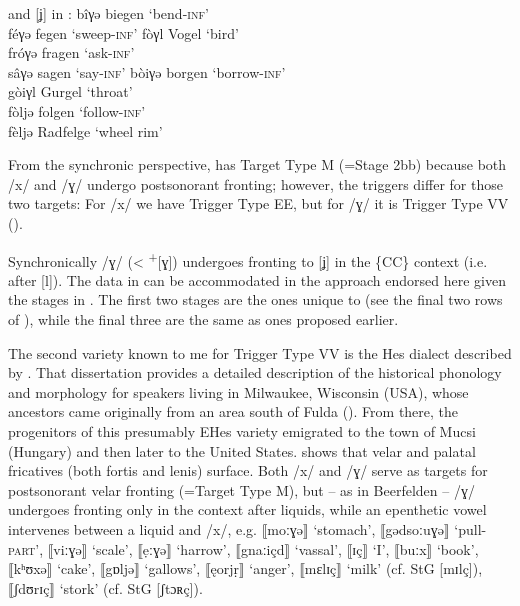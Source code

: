 \ea%
\label{ex:12:21}\relax[ɣ] and [ʝ] in :
\ea\label{ex:12:21a} bîγǝ \tab [bɪːɣǝ] \tab biegen \tab ‘bend\textsc{{}-inf}’ \\
    féγǝ \tab [feːɣǝ] \tab fegen \tab ‘sweep\textsc{{}-inf}’ 
\ex\label{ex:12:21b} fòγl \tab [fɔɣl̩] \tab Vogel \tab ‘bird’ \\
    fróγǝ \tab [froːɣǝ] \tab fragen \tab ‘ask\textsc{{}-inf}’ \\
    sâγǝ \tab [sɑːɣǝ] \tab sagen \tab ‘say\textsc{{}-inf}’ 
\ex\label{ex:12:21c} bòiγǝ \tab [bɔiɣǝ] \tab borgen \tab ‘borrow\textsc{{}-inf}’ \\
    gòiγl \tab [gɔiɣl̩] \tab Gurgel \tab ‘throat’ \\
\ex\label{ex:12:21d} fòljǝ \tab [fɔlʝǝ] \tab folgen \tab ‘follow\textsc{{}-inf}’ \\
    fèljǝ \tab [fɛlʝǝ] \tab Radfelge \tab ‘wheel rim’ 
\z 
\z 

From the synchronic perspective,  has Target Type M (=Stage 2bb) because both /x/ and /ɣ/ undergo postsonorant fronting; however, the triggers differ for those two targets: For /x/ we have Trigger Type EE, but for /ɣ/ it is Trigger Type VV ().

Synchronically /ɣ/ (< \textsuperscript{+}[ɣ]) undergoes fronting to [ʝ] in the \{CC\} context (i.e. after [l]). The data in  can be accommodated in the  approach endorsed here given the stages in . The first two stages are the ones unique to  (see the final two rows of ), while the final three are the same as ones proposed earlier.

The second variety known to me for Trigger Type VV is the Hes dialect described by \citet{Gommermann1975}. That dissertation provides a detailed description of the historical phonology and morphology for speakers living in Milwaukee, Wisconsin (USA), whose ancestors came originally from an area south of Fulda (). From there, the progenitors of this presumably EHes variety emigrated to the town of Mucsi (Hungary) and then later to the United States. \citet[105--106; 108--109]{Gommermann1975} shows that velar and palatal fricatives (both fortis and lenis) surface. Both /x/ and /ɣ/ serve as targets for postsonorant velar fronting (=Target Type M), but -- as in Beerfelden -- /ɣ/ undergoes fronting only in the context after liquids, while an epenthetic vowel intervenes between a liquid and /x/, e.g. ⟦moːɣə⟧ ‘stomach’, ⟦gədsoːuɣə⟧ ‘pull-\textsc{part}’, ⟦viːɣə⟧ ‘scale’, ⟦ẹːɣə⟧ ‘harrow’,  ⟦gnaːiçd⟧ ‘vassal’, ⟦ɪç⟧ ‘I’, ⟦buːx⟧ ‘book’,  ⟦kʰʊxə⟧ ‘cake’, ⟦gɒljə⟧ ‘gallows’, ⟦ęorjṛ⟧ ‘anger’, ⟦mɛlɪç⟧ ‘milk’ (cf. StG [mɪlç]), ⟦ʃdʊrɪç⟧ ‘stork’ (cf. StG [ʃtɔʀç]). 

